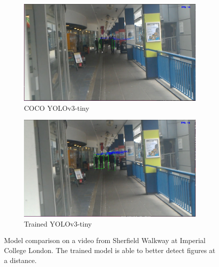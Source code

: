 \begin{figure}[ht]
    \begin{subfigure}[b]{.5\textwidth}
        \centering
        \includegraphics[width=0.95\linewidth]{img/chapter4_analysis/yoloCoco.png}
        \caption{COCO YOLOv3-tiny}
    \end{subfigure}%
    \hspace{\fill} 
    \begin{subfigure}[b]{.5\textwidth}
        \centering
        \includegraphics[width=0.95\linewidth]{img/chapter4_analysis/yoloCH.png}
        \caption{Trained YOLOv3-tiny}
    \end{subfigure}
    \vspace{-2\baselineskip}
    \begin{center}
        \caption{Model comparison on a video from Sherfield Walkway at Imperial College London. The trained model is able to better detect figures at a distance.}
        \label{fig:yoloCHvsCoco}
    \end{center}
    \vspace{-2\baselineskip}
\end{figure}

